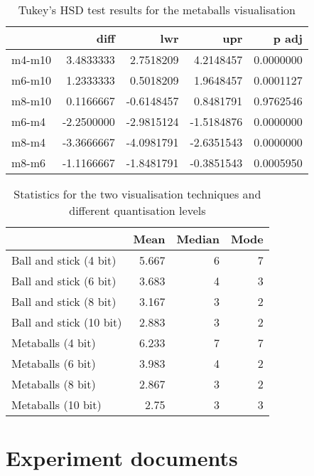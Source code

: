 \begin{table}
  \begin{tabular}{ | l | r | r | r | r |}
  \hline
         &       diff &        lwr &        upr &     p adj  \\ \hline
  m4-m10 &  3.4833333 &  2.7518209 &  4.2148457 & 0.0000000  \\ \hline
  m6-m10 &  1.2333333 &  0.5018209 &  1.9648457 & 0.0001127  \\ \hline
  m8-m10 &  0.1166667 & -0.6148457 &  0.8481791 & 0.9762546  \\ \hline
  m6-m4  & -2.2500000 & -2.9815124 & -1.5184876 & 0.0000000  \\ \hline
  m8-m4  & -3.3666667 & -4.0981791 & -2.6351543 & 0.0000000  \\ \hline
  m8-m6  & -1.1166667 & -1.8481791 & -0.3851543 & 0.0005950  \\ \hline
  \end{tabular}
  \caption{Tukey's HSD test results for the metaballs visualisation}
  \label{tab:appendix_metaballs_tukeyhsd}
\end{table}


\begin{table}
  \begin{tabular}{ | l | r | r | r | }
  \hline
                          &  Mean & Median & Mode  \\ \hline
  Ball and stick (4 bit)  & 5.667 &      6 &    7  \\ \hline
  Ball and stick (6 bit)  & 3.683 &      4 &    3  \\ \hline
  Ball and stick (8 bit)  & 3.167 &      3 &    2  \\ \hline
  Ball and stick (10 bit) & 2.883 &      3 &    2  \\ \hline
  Metaballs (4 bit)       & 6.233 &      7 &    7  \\ \hline
  Metaballs (6 bit)       & 3.983 &      4 &    2  \\ \hline
  Metaballs (8 bit)       & 2.867 &      3 &    2  \\ \hline
  Metaballs (10 bit)      &  2.75 &      3 &    3  \\ \hline
  \end{tabular}
  \caption{Statistics for the two visualisation techniques and different
  quantisation levels}
  \label{tab:appendix_experiment_statistics}
\end{table}


\chapter{Experiment documents}
\label{cha:documents}

